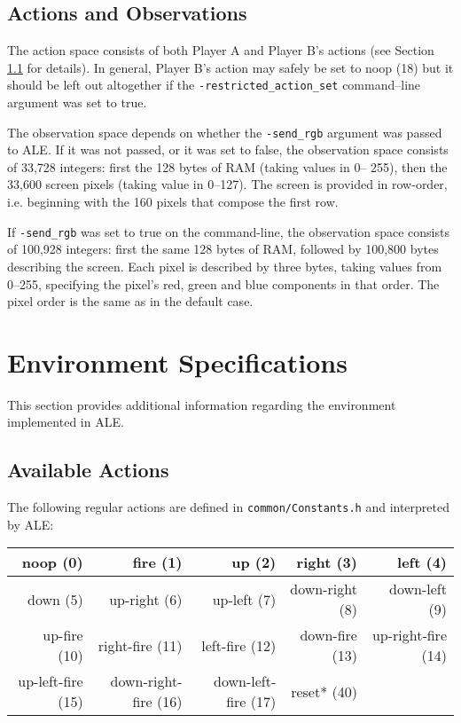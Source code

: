 \documentclass[12pt]{article}
\begin{document}
\subsection{Actions and Observations}

The action space consists of both Player A and Player B's actions (see Section 
\ref{sec:available_actions}
for details). In general, Player B's action may safely be set to noop (18) but it should be left out
altogether if the \verb+-restricted_action_set+ command--line argument was set to true. 

The observation space depends on whether the \verb+-send_rgb+ argument was passed to ALE. If it was
not passed,  or it was set to false, the observation space consists of 33,728 integers: first the
128 bytes of RAM (taking values in 0-- 255), then the 33,600 screen pixels (taking value in 0--127).
The screen is provided in row-order, i.e. beginning with the 160 pixels that compose the first row.

 If \verb+-send_rgb+ was set to true on the command-line, the observation space consists of 100,928 
 integers: first the same 128 bytes of RAM, followed by 100,800 bytes describing the screen.
 Each pixel is described by three bytes, taking values from 0--255, specifying the pixel's 
 red, green and blue components in that order. The pixel order is the same as in the default
 case.

\section{Environment Specifications}\label{sec:environment_specifications}

This section provides additional information regarding the environment implemented in ALE.

\subsection{Available Actions}\label{sec:available_actions}

The following regular actions are defined in \verb+common/Constants.h+ and interpreted by ALE:

\begin{center}
\begin{tabular}{|r|r|r|r|r|}
\hline
noop (0) & fire (1) & up (2) & right (3) & left (4) \\
\hline
down (5) & up-right (6) & up-left (7) & down-right (8) & down-left (9) \\
\hline
up-fire (10) & right-fire (11) & left-fire (12) & down-fire (13) & up-right-fire (14) \\
\hline
up-left-fire (15) & down-right-fire (16) & down-left-fire (17) & reset* (40) & \\
\hline
\end{tabular}
\end{center}
\end{document}
